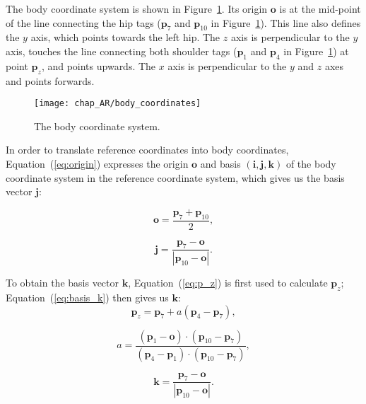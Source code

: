 The body coordinate system is shown in Figure~\ref{fig:body_coordinate}. Its origin $\mathbf{o}$ is at the mid-point of the line connecting the hip tags ($\mathbf{p}_7$ and $\mathbf{p}_{10}$ in Figure~\ref{fig:body_coordinate}). This line also defines the $y$ axis, which points towards the left hip. The $z$ axis is perpendicular to the $y$ axis, touches the line connecting both shoulder tags ($\mathbf{p}_1$ and $\mathbf{p}_4$ in Figure~\ref{fig:body_coordinate}) at point $\mathbf{p}_z$, and points upwards. The $x$ axis is perpendicular to the $y$ and $z$ axes and points forwards.


\begin{figure}[!h]
\centering
\texttt{[image: chap\_AR/body\_coordinates]}
\caption{The body coordinate system.}
\label{fig:body_coordinate}
\end{figure}

In order to translate reference coordinates into body coordinates, Equation~(\ref{eq:origin}) expresses the origin $\mathbf{o}$ and basis $(\mathbf{i}, \mathbf{j}, \mathbf{k})$ of the body coordinate system in the reference coordinate system, which gives us the basis vector $\mathbf{j}$:

\begin{equation}
\label{eq:origin}
\mathbf{o}=\frac{\mathbf{p}_7 + \mathbf{p}_{10} }{2},
\end{equation}

\begin{equation}
\label{eq:basis_j}
\mathbf{j}=\frac{\mathbf{p}_7 - \mathbf{o} }{|\mathbf{p}_{10} - \mathbf{o}|}.
\end{equation}

\noindent
To obtain the basis vector $\mathbf{k}$, Equation~(\ref{eq:p_z}) is first used to calculate $\mathbf{p}_z$; Equation~(\ref{eq:basis_k}) then gives us $\mathbf{k}$:
\begin{equation}
\label{eq:p_z}
\mathbf{p}_z = \mathbf{p}_7 + a(\mathbf{p}_4 - \mathbf{p}_7),
\end{equation}

\begin{equation}
a 	= \frac{(\mathbf{p}_1 - \mathbf{o}) \cdot (\mathbf{p}_{10} - \mathbf{p}_7)}{(\mathbf{p}_4 - \mathbf{p}_1) \cdot  (\mathbf{p}_{10} - \mathbf{p}_7)},
\end{equation}

\begin{equation}
\label{eq:basis_k}
\mathbf{k}=\frac{\mathbf{p}_7 - \mathbf{o} }{|\mathbf{p}_{10} - \mathbf{o}|}.
\end{equation}


